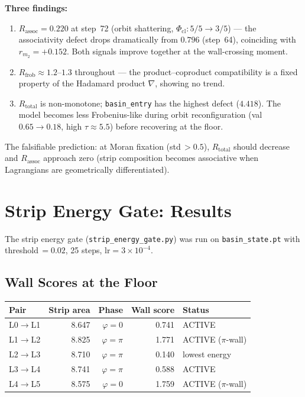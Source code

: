 \documentclass[11pt]{amsart}
\begin{document}
\textbf{Three findings:}
\begin{enumerate}
\item $R_\mathrm{assoc} = 0.220$ at step~72 (orbit shattering,
  $\Phi_\mathrm{cl}: 5/5 \to 3/5$) --- the associativity defect
  drops dramatically from $0.796$ (step~64), coinciding with
  $r_{m_2} = +0.152$. Both signals improve together at the
  wall-crossing moment.
\item $R_\mathrm{frob} \approx 1.2$--$1.3$ throughout --- the
  product--coproduct compatibility is a fixed property of the
  Hadamard product $\nabla$, showing no trend.
\item $R_\mathrm{total}$ is non-monotone;
  \texttt{basin\_entry} has the highest defect ($4.418$).
  The model becomes less Frobenius-like during orbit reconfiguration
  (val $0.65 \to 0.18$, high $\tau \approx 5.5$) before
  recovering at the floor.
\end{enumerate}

The falsifiable prediction: at Moran fixation (std\,$> 0.5$),
$R_\mathrm{total}$ should decrease and $R_\mathrm{assoc}$
approach zero (strip composition becomes associative when
Lagrangians are geometrically differentiated).

\section{Strip Energy Gate: Results}
\label{sec:energy_gate}

The strip energy gate (\texttt{strip\_energy\_gate.py}) was run on
\texttt{basin\_state.pt} with threshold\,$=0.02$, 25 steps, $\mathrm{lr}=3\times10^{-4}$.

\subsection{Wall Scores at the Floor}

\begin{center}
\small
\begin{tabular}{@{}lrrrl@{}}
\toprule
Pair & Strip area & Phase & Wall score & Status \\
\midrule
L0$\to$L1 & 8.647 & $\varphi=0$ & 0.741 & ACTIVE \\
L1$\to$L2 & 8.825 & $\varphi=\pi$ & 1.771 & ACTIVE ($\pi$-wall) \\
L2$\to$L3 & 8.710 & $\varphi=\pi$ & 0.140 & lowest energy \\
L3$\to$L4 & 8.741 & $\varphi=\pi$ & 0.588 & ACTIVE \\
L4$\to$L5 & 8.575 & $\varphi=0$ & 1.759 & ACTIVE ($\pi$-wall) \\
\bottomrule
\end{tabular}
\end{center}
\end{document}
